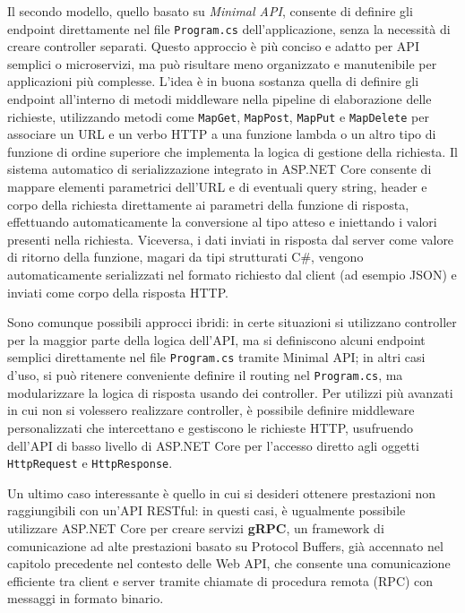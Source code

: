 Il secondo modello, quello basato su \emph{Minimal API}, consente di definire gli endpoint direttamente nel file \texttt{Program.cs} dell'applicazione, senza la necessità di creare controller separati. Questo approccio è più conciso e adatto per API semplici o microservizi, ma può risultare meno organizzato e manutenibile per applicazioni più complesse.
L'idea è in buona sostanza quella di definire gli endpoint all'interno di metodi middleware nella pipeline di elaborazione delle richieste, utilizzando metodi come \texttt{MapGet}, \texttt{MapPost}, \texttt{MapPut} e \texttt{MapDelete} per associare un URL e un verbo HTTP a una funzione lambda o un altro tipo di funzione di ordine superiore che implementa la logica di gestione della richiesta. Il sistema automatico di serializzazione integrato in ASP.NET Core consente di mappare elementi parametrici dell'URL e di eventuali query string, header e corpo della richiesta direttamente ai parametri della funzione di risposta, effettuando automaticamente la conversione al tipo atteso e iniettando i valori presenti nella richiesta. Viceversa, i dati inviati in risposta dal server come valore di ritorno della funzione, magari da tipi strutturati C\#, vengono automaticamente serializzati nel formato richiesto dal client (ad esempio JSON) e inviati come corpo della risposta HTTP.

Sono comunque possibili approcci ibridi: in certe situazioni si utilizzano controller per la maggior parte della logica dell'API, ma si definiscono alcuni endpoint semplici direttamente nel file \texttt{Program.cs} tramite Minimal API; in altri casi d'uso, si può ritenere conveniente definire il routing nel \texttt{Program.cs}, ma modularizzare la logica di risposta usando dei controller.
Per utilizzi più avanzati in cui non si volessero realizzare controller, è possibile definire middleware personalizzati che intercettano e gestiscono le richieste HTTP, usufruendo dell'API di basso livello di ASP.NET Core per l'accesso diretto agli oggetti \texttt{HttpRequest} e \texttt{HttpResponse}.

Un ultimo caso interessante è quello in cui si desideri ottenere prestazioni non raggiungibili con un'API RESTful: in questi casi, è ugualmente possibile utilizzare ASP.NET Core per creare servizi \textbf{gRPC}, un framework di comunicazione ad alte prestazioni basato su Protocol Buffers, già accennato nel capitolo precedente nel contesto delle Web API, che consente una comunicazione efficiente tra client e server tramite chiamate di procedura remota (RPC) con messaggi in formato binario.

